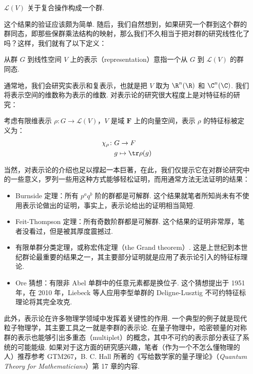 \begin{lemma}
    $\mathcal{L}(V)$ 关于复合操作构成一个群.
\end{lemma}

这个结果的验证应该颇为简单. 随后，我们自然想到，如果研究一个群到这个群的群同态，即那些保群乘法结构的映射，那么我们不久相当于把对群的研究线性化了吗？这样，我们就有了以下定义：

\begin{definition}
    从群 $G$ 到线性空间 $V$ 上的表示（representation）意指一个从 $G$ 到 $\mathcal{L}(V)$ 的群同态.
\end{definition}

通常地，我们会研究实表示和复表示，也就是把 $V$ 取为 $\R^n(\R)$ 和 $\C^n(\C)$. 我们将表示空间的维数称为表示的维数. 对表示论的研究很大程度上是对特征标的研究：

\begin{definition}
    考虑有限维表示 $\rho: G \to \mathcal{L}(V)$，$V$ 是域 $\mathbf{F}$ 上的向量空间，表示 $\rho$ 的特征标被定义为：
    \begin{align*}
        \chi_\rho \colon &  G \to F \\
        & g  \mapsto  \tr \rho(g)
    \end{align*}
\end{definition}

当然，对表示论的介绍也足以撑起一本巨著，在此，我们仅提示它在对群论研究中的一些意义，罗列一些用这种方式能够轻松证明，而用通常方法无法证明的结果：
\begin{itemize}
    \item Burnside 定理：所有 $p^aq^b$ 阶的群都是可解群. 这个结果就笔者所知尚未有不使用表示论做出的证明，事实上，表示论给出的证明相当简短.
    \item Feit-Thompson 定理：所有奇数阶群都是可解群. 这个结果的证明非常厚，笔者没看过，但是被其厚度震撼过.
    \item 有限单群分类定理，或称宏伟定理（the Grand theorem）. 这是上世纪到本世纪群论最重要的结果之一，其主要部分证明就是应用了表示论引入的特征标理论.
    \item Ore 猜想：有限非 Abel 单群中的任意元素都是换位子. 这个猜想提出于 1951 年，在 2010 年，Liebeck 等人应用李型单群的 Deligne-Lusztig 不可约特征标理论将其完全攻克.
\end{itemize}

此外，表示论在许多物理学领域中发挥着关键性的作用. 一个典型的例子就是现代粒子物理学，其主要工具之一就是李群的表示论. 在量子物理中，哈密顿量的对称群的表示也能够引出多重态（multiplet）的概念，其中不可约的表示部分表征了系统的可能能级. 如果对于这方面的研究感兴趣，笔者（作为一个不怎么懂物理的人）推荐参考 GTM267，B. C. Hall 所著的《写给数学家的量子理论》（\textit{Quantum Theory for Mathematicians}）第 17 章的内容.

